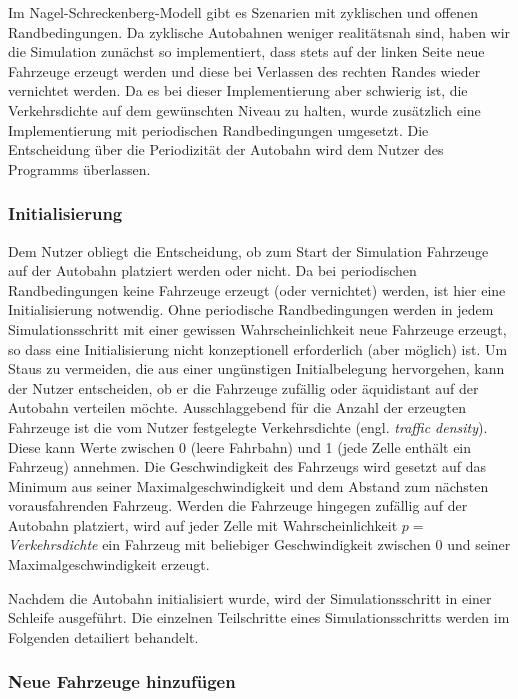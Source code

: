 \documentclass[10pt, a4paper]{article}
\newcommand\nsm{Nagel-Schreckenberg-Modell }
\begin{document}
Im \nsm gibt es Szenarien mit zyklischen und offenen Randbedingungen. Da zyklische Autobahnen weniger realitätsnah sind, haben wir die Simulation zunächst so implementiert, dass stets auf der linken Seite neue Fahrzeuge erzeugt werden und diese bei Verlassen des rechten Randes wieder vernichtet werden. Da es bei dieser Implementierung aber schwierig ist, die Verkehrsdichte auf dem gewünschten Niveau zu halten, wurde zusätzlich eine Implementierung mit periodischen Randbedingungen umgesetzt. Die Entscheidung über die Periodizität der Autobahn wird dem Nutzer des Programms überlassen.

\subsubsection{Initialisierung}
\label{subsubsec:initialisierung}

Dem Nutzer obliegt die Entscheidung, ob zum Start der Simulation Fahrzeuge auf der Autobahn platziert werden oder nicht. Da bei periodischen Randbedingungen keine Fahrzeuge erzeugt (oder vernichtet) werden, ist hier eine Initialisierung notwendig. Ohne periodische Randbedingungen werden in jedem Simulationsschritt mit einer gewissen Wahrscheinlichkeit neue Fahrzeuge erzeugt, so dass eine Initialisierung nicht konzeptionell erforderlich (aber möglich) ist. Um Staus zu vermeiden, die aus einer ungünstigen Initialbelegung hervorgehen, kann der Nutzer entscheiden, ob er die Fahrzeuge zufällig oder äquidistant auf der Autobahn verteilen möchte.
Ausschlaggebend für die Anzahl der erzeugten Fahrzeuge ist die vom Nutzer festgelegte Verkehrsdichte (engl. \emph{traffic density}). Diese kann Werte zwischen 0 (leere Fahrbahn) und 1 (jede Zelle enthält ein Fahrzeug) annehmen. Die Geschwindigkeit des Fahrzeugs wird gesetzt auf das Minimum aus seiner Maximalgeschwindigkeit und dem Abstand zum nächsten vorausfahrenden Fahrzeug. Werden die Fahrzeuge hingegen zufällig auf der Autobahn platziert, wird auf jeder Zelle mit Wahrscheinlichkeit $p =$ \emph{Verkehrsdichte} ein Fahrzeug mit beliebiger Geschwindigkeit zwischen 0 und seiner Maximalgeschwindigkeit erzeugt.

Nachdem die Autobahn initialisiert wurde, wird der Simulationsschritt in einer Schleife ausgeführt. Die einzelnen Teilschritte eines Simulationsschritts werden im Folgenden detailiert behandelt.


\subsubsection{Neue Fahrzeuge hinzufügen}
\label{subsubsec:neueFahrzeuge}
\end{document}
